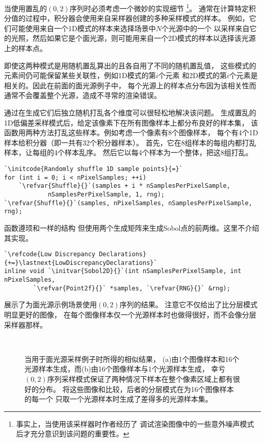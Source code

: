 当使用置乱的$(0,2)$序列时必须考虑一个微妙的实现细节
\footnote{事实上，当使用该采样器时作者经历了
    调试渲染图像中的一些意外噪声模式后才充分意识到该问题的重要性。}。
通常在计算特定积分值的过程中，积分器会使用来自采样器创建的多种采样模式的样本。
例如，它们可能使用来自一个1D模式的样本来选择场景中$N$个光源中的一个
以采样来自它的光照，然后如果它是个面光源，则可能用来自一个2D模式的样本以选择该光源上的样本点。

即使这两种模式是用随机置乱算出的且各自用了不同的随机置乱值，
这些模式的元素间仍可能保留某些关联性，例如1D模式的第$i$个元素
和2D模式的第$i$个元素是相关的。因此在前面的面光源例子中，
每个光源上的样本点分布因为该相关性而通常不会覆盖整个光源，造成不寻常的渲染错误。

通过在生成它们后独立随机打乱各个维度可以很轻松地解决该问题。
生成置乱的1D低偏差采样模式后，给定该像素下在所有图像样本上都分布良好的样本集，
该函数用两种方法打乱这些样本。例如考虑一个像素有8个图像样本，
每个有4个1D样本给积分器（即一共有32个积分器样本）。
首先，它在8组样本的每组内都打乱样本，让每组的4个样本乱序。
然后它以每4个样本为一个整体，把这8组打乱。
\begin{lstlisting}
`\initcode{Randomly shuffle 1D sample points}{=}`
for (int i = 0; i < nPixelSamples; ++i)
    `\refvar{Shuffle}{}`(samples + i * nSamplesPerPixelSample,
            nSamplesPerPixelSample, 1, rng);
`\refvar{Shuffle}{}`(samples, nPixelSamples, nSamplesPerPixelSample, rng);
\end{lstlisting}

函数遵顼和一样的结构
但使用两个生成矩阵来生成Sobol点的前两维。这里不介绍其实现。
\begin{lstlisting}
`\refcode{Low Discrepancy Declarations}{+=}\lastnext{LowDiscrepancyDeclarations}`
inline void `\initvar{Sobol2D}{}`(int nSamplesPerPixelSample, int nPixelSamples,
        `\refvar{Point2f}{}` *samples, `\refvar{RNG}{}` &rng);
\end{lstlisting}

展示了为面光源示例场景使用$(0,2)$序列的结果。
注意它不仅给出了比分层模式明显更好的图像，
在每个图像样本仅一个光源样本时也做得很好，而不会像分层采样器那样。
\begin{figure}[htbp]
    \centering
    \\
    \caption{当用于面光源采样例子时所得的相似结果，
        (a)由1个图像样本和16个光源样本生成，而(b)由16个图像样本与1个光源样本生成，
        幸亏$(0,2)$序列采样模式保证了两种情况下样本在整个像素区域上都有很好的分布。
        将这些图像和比较，后者的分层模式在为16个图像样本的每一个
        只取一个光源样本时生成了差得多的光源样本集。}
    \label{fig:7.31}
\end{figure}